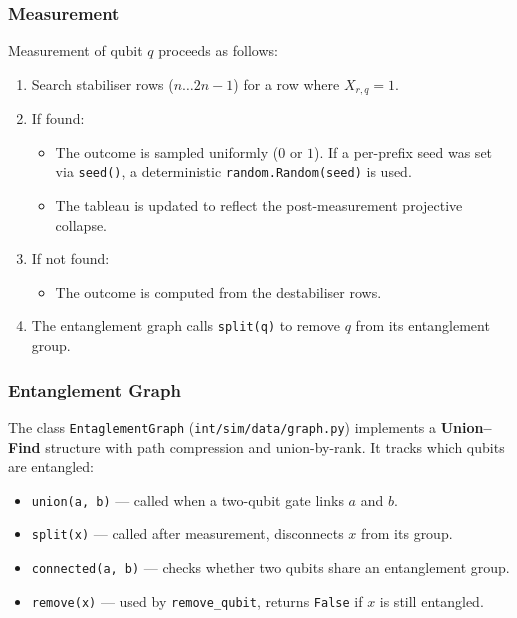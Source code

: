 \subsubsection{Measurement}

Measurement of qubit $q$ proceeds as follows:

\begin{enumerate}
    \item Search stabiliser rows ($n \ldots 2n{-}1$) for a row where
          $X_{r,q} = 1$.
    \item If found:
    \begin{itemize}
        \item The outcome is sampled uniformly ($0$ or $1$).  If a per-prefix
              seed was set via \texttt{seed()}, a deterministic
              \texttt{random.Random(seed)} is used.
        \item The tableau is updated to reflect the post-measurement
              projective collapse.
    \end{itemize}
    \item If not found:
    \begin{itemize}
        \item The outcome is computed from the destabiliser rows.
    \end{itemize}
    \item The entanglement graph calls \texttt{split(q)} to remove $q$ from
          its entanglement group.
\end{enumerate}

\subsubsection{Entanglement Graph}

The class \texttt{EntaglementGraph} (\texttt{int/sim/data/graph.py})
implements a \textbf{Union--Find} structure with path compression and
union-by-rank.  It tracks which qubits are entangled:

\begin{itemize}
    \item \texttt{union(a, b)} --- called when a two-qubit gate links
          $a$ and $b$.
    \item \texttt{split(x)} --- called after measurement, disconnects
          $x$ from its group.
    \item \texttt{connected(a, b)} --- checks whether two qubits share an
          entanglement group.
    \item \texttt{remove(x)} --- used by \texttt{remove\_qubit}, returns
          \texttt{False} if $x$ is still entangled.
\end{itemize}

